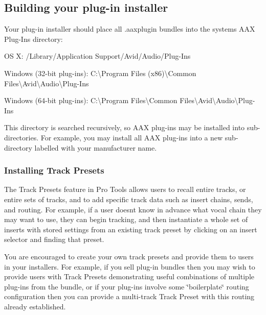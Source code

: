  \hypertarget{a00843_aax_distributing_installer}{}\subsection{Building your plug-\/in installer}\label{a00843_aax_distributing_installer}
 Your plug-\/in installer should place all .aaxplugin bundles into the system\textquotesingle{}s A\+AX Plug-\/\+Ins directory\+:


\begin{DoxyItemize}
\item OS X\+: /\+Library/\+Application Support/\+Avid/\+Audio/\+Plug-\/\+Ins  
\item Windows (32-\/bit plug-\/ins)\+: C\+:\textbackslash{}Program Files (x86)\textbackslash{}Common Files\textbackslash{}Avid\textbackslash{}Audio\textbackslash{}Plug-\/\+Ins  
\item Windows (64-\/bit plug-\/ins)\+: C\+:\textbackslash{}Program Files\textbackslash{}Common Files\textbackslash{}Avid\textbackslash{}Audio\textbackslash{}Plug-\/\+Ins  
\end{DoxyItemize}

 This directory is searched recursively, so A\+AX plug-\/ins may be installed into sub-\/directories. For example, you may install all A\+AX plug-\/ins into a new sub-\/directory labelled with your manufacturer name.

\hypertarget{a00843_aax_distributing_installer_trackpresets}{}\subsubsection{Installing Track Presets}\label{a00843_aax_distributing_installer_trackpresets}
 The Track Presets feature in Pro Tools allows users to recall entire tracks, or entire sets of tracks, and to add specific track data such as insert chains, sends, and routing. For example, if a user doesn\textquotesingle{}t know in advance what vocal chain they may want to use, they can begin tracking, and then instantiate a whole set of inserts with stored settings from an existing track preset by clicking on an insert selector and finding that preset.

 You are encouraged to create your own track presets and provide them to users in your installers. For example, if you sell plug-\/in bundles then you may wish to provide users with Track Presets demonstrating useful combinations of multiple plug-\/ins from the bundle, or if your plug-\/ins involve some \char`\"{}boilerplate\char`\"{} routing configuration then you can provide a multi-\/track Track Preset with this routing already established.

